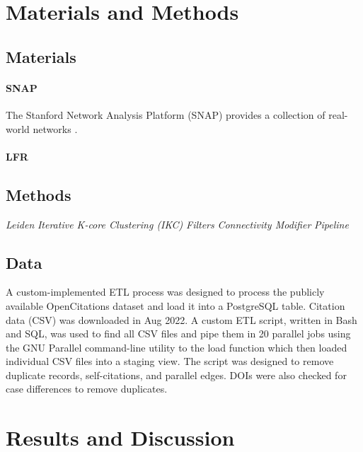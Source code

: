 \documentclass[12pt, oneside]{article}   	%
\begin{document}
\section{Materials and Methods}

\subsection{Materials}

\paragraph{SNAP}
The Stanford Network Analysis Platform (SNAP) provides a collection of real-world networks \citep{leskovec2016snap}.

\paragraph{LFR}


	
\subsection{Methods} 
\emph{Leiden}
\emph{Iterative K-core Clustering (IKC)}
\emph{Filters}
\emph{Connectivity Modifier}
\emph{Pipeline}

\subsection{Data}  A custom-implemented ETL process was designed to process the publicly available OpenCitations dataset and load it into a PostgreSQL table. Citation data (CSV) was downloaded in Aug 2022.
A custom ETL script, written in Bash and SQL, was used to find all CSV files and pipe them in 20 parallel jobs using the GNU Parallel command-line utility to the load function which then loaded individual CSV files 
into a staging view. The script was designed to remove duplicate records, self-citations, and parallel edges. DOIs were also checked for case differences to remove duplicates. 

\section{Results and Discussion}
\end{document}
